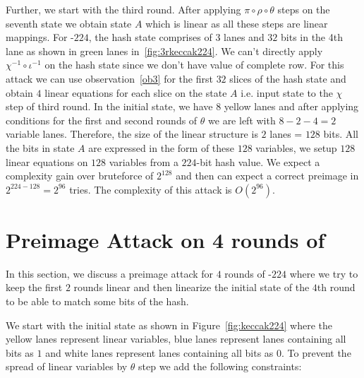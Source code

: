 Further, we start with the third round. After applying $\pi \circ \rho \circ \theta$ steps on the seventh state we obtain state $A$ which is linear as all these steps are linear mappings. For \Keccak{}-$224$, the hash state comprises of $3$ lanes and $32$ bits in the 4th lane as shown in green lanes in~\ref{fig:3rkeccak224}. We can't directly apply $\chi^{-1} \circ \iota^{-1}$ on the hash state since we don't have value of complete row. For this attack we can use observation~\ref{ob3} for the first $32$ slices of the hash state and obtain $4$ linear equations for each slice on the state $A$ i.e. input state to the $\chi$ step of third round. In the initial state, we have $8$ yellow lanes and after applying conditions for the first and second rounds of $\theta$ we are left with $8 - 2 - 4 = 2$ variable lanes. Therefore, the size of the linear structure is $2$ lanes = $128$ bits. All the bits in state $A$ are expressed in the form of these $128$ variables, we setup $128$ linear equations on $128$ variables from a $224$-bit hash value. We expect a complexity gain over bruteforce of $2^{128}$ and then can expect a correct preimage in $2^{224 - 128} = 2^{96}$ tries. The complexity of this attack is $O(2^{96})$.

\section{Preimage Attack on 4 rounds of }
    
In this section, we discuss a preimage attack for $4$ rounds of \KECCAK{}-$224$ where we try to keep the first $2$ rounds linear and then linearize the initial state of the $4$th round to be able to match some bits of the hash.

We start with the initial state as shown in Figure~\ref{fig:keccak224} where the yellow lanes represent linear variables, blue lanes represent lanes containing all bits as $1$ and white lanes represent lanes containing all bits as $0$. To prevent the spread of linear variables by $\theta$ step we add the following constraints:

